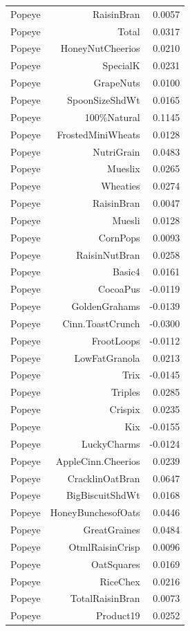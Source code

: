 \begin{longtable}{@{}lrr@{}}
Popeye & RaisinBran & 0.0057 \\
Popeye & Total & 0.0317 \\
Popeye & HoneyNutCheerios & 0.0210 \\
Popeye & SpecialK & 0.0231 \\
Popeye & GrapeNuts & 0.0100 \\
Popeye & SpoonSizeShdWt & 0.0165 \\
Popeye & 100\%Natural & 0.1145 \\
Popeye & FrostedMiniWheats & 0.0128 \\
Popeye & NutriGrain & 0.0483 \\
Popeye & Mueslix & 0.0265 \\
Popeye & Wheaties & 0.0274 \\
Popeye & RaisinBran & 0.0047 \\
Popeye & Muesli & 0.0128 \\
Popeye & CornPops & 0.0093 \\
Popeye & RaisinNutBran & 0.0258 \\
Popeye & Basic4 & 0.0161 \\
Popeye & CocoaPus & -0.0119 \\
Popeye & GoldenGrahams & -0.0139 \\
Popeye & Cinn.ToastCrunch & -0.0300 \\
Popeye & FrootLoops & -0.0112 \\
Popeye & LowFatGranola & 0.0213 \\
Popeye & Trix & -0.0145 \\
Popeye & Triples & 0.0285 \\
Popeye & Crispix & 0.0235 \\
Popeye & Kix & -0.0155 \\
Popeye & LuckyCharms & -0.0124 \\
Popeye & AppleCinn.Cheerios & 0.0239 \\
Popeye & CracklinOatBran & 0.0647 \\
Popeye & BigBiscuitShdWt & 0.0168 \\
Popeye & HoneyBunchesofOats & 0.0446 \\
Popeye & GreatGraines & 0.0484 \\
Popeye & OtmlRaisinCrisp & 0.0096 \\
Popeye & OatSquares & 0.0169 \\
Popeye & RiceChex & 0.0216 \\
Popeye & TotalRaisinBran & 0.0073 \\
Popeye & Product19 & 0.0252 \\

\end{longtable}
